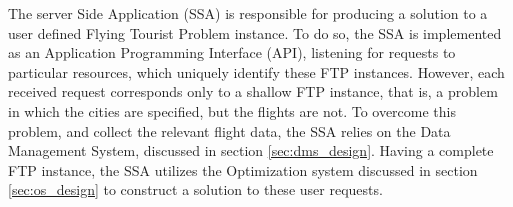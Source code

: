 The server Side Application (SSA) is responsible for producing a solution to a user defined Flying Tourist Problem instance. To do so, the SSA is implemented as an Application Programming Interface (API), listening for requests to particular resources, which uniquely identify these FTP instances. However, each received request corresponds only to a shallow FTP instance, that is, a problem in which the cities are specified, but the flights are not. To overcome this problem, and collect the relevant flight data, the SSA relies on the Data Management System, discussed in section \ref{sec:dms_design}. Having a complete FTP instance, the SSA utilizes the Optimization system discussed in section \ref{sec:os_design} to construct a solution to these user requests.


